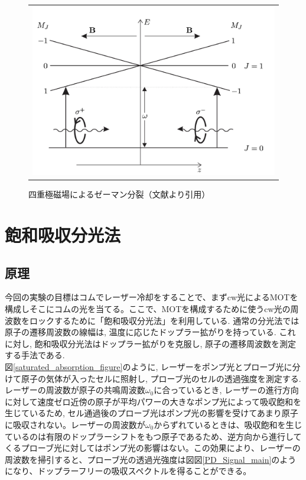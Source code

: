 \documentclass[uplatex, dvipdfmx, a4paper, report, papersize, 11pt]{jsbook}
\begin{document}
\begin{figure}[htpb]
\begin{tabular}{c}
      \begin{minipage}{0.50\hsize}
        \centering
          \includegraphics[keepaspectratio,  scale=0.40,  angle=0]
                          {figures/chapter2/MOT_zeeman_split.png}
                          \caption{四重極磁場によるゼーマン分裂（文献\cite{Foot:1080846}より引用）}
                          \label{MOT_zeeman_split}
      \end{minipage}


    \end{tabular}
\end{figure}

\newpage
\section{飽和吸収分光法}
\subsection{原理}
今回の実験の目標はコムでレーザー冷却をすることで、まずcw光によるMOTを構成しそこにコムの光を当てる。ここで、MOTを構成するために使うcw光の周波数をロックするために「飽和吸収分光法」を利用している. 通常の分光法では原子の遷移周波数の線幅は, 温度に応じたドップラー拡がりを持っている. これに対し, 飽和吸収分光法はドップラー拡がりを克服し, 原子の遷移周波数を測定する手法である. \\図\ref{saturated_absorption_figure}のように, レーザーをポンプ光とプローブ光に分けて原子の気体が入ったセルに照射し, プローブ光のセルの透過強度を測定する.\\
レーザーの周波数が原子の共鳴周波数$\omega_0$に合っているとき, レーザーの進行方向に対して速度ゼロ近傍の原子が平均パワーの大きなポンプ光によって吸収飽和を生じているため, セル通過後のプローブ光はポンプ光の影響を受けてあまり原子に吸収されない。レーザーの周波数が$\omega_0$からずれているときは、吸収飽和を生じているのは有限のドップラーシフトをもつ原子であるため、逆方向から進行してくるプローブ光に対してはポンプ光の影響はない。この効果により、レーザーの周波数を掃引すると、プローブ光の透過光強度は図図\ref{PD_Signal_main}のようになり、ドップラーフリーの吸収スペクトルを得ることができる。
\end{document}
